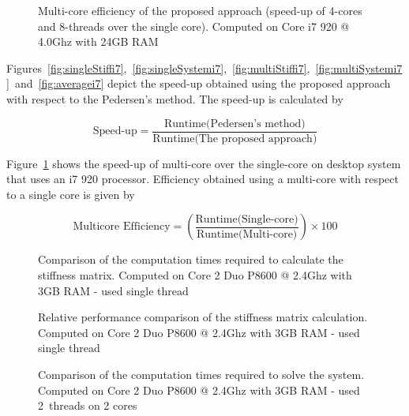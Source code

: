 \begin{figure}
\centerline{}
\caption{Multi-core efficiency of the proposed approach (speed-up of 4-cores and 8-threads over the single core). Computed on Core i7 920 @ 4.0Ghz with 24GB RAM}
\label{fig:mcEfficiencyi7}
\end{figure}

Figures~\ref{fig:singleStiffi7},~\ref{fig:singleSystemi7},~\ref{fig:multiStiffi7},~\ref{fig:multiSystemi7}~and~\ref{fig:averagei7} depict the speed-up obtained using the proposed approach with respect to the Pedersen's method. The speed-up is calculated by

\begin{equation}
\text{Speed-up} = \frac{\text{Runtime(Pedersen's method)}}{\text{Runtime(The proposed approach)}}
\label{eqn:5.2}
\end{equation}

Figure~\ref{fig:mcEfficiencyi7} shows the speed-up of multi-core over the single-core on desktop system that uses an i7 920 processor.
Efficiency obtained using a multi-core with respect to a single core is given by

\begin{equation}
\text{Multicore Efficiency} = \left(\frac{\text{Runtime(Single-core)}}{\text{Runtime(Multi-core)}}\right) \times 100
\label{eqn:5.3}
\end{equation}

\clearpage
\begin{figure}
\centerline{}
\caption{Comparison of the computation times required to calculate the stiffness matrix. Computed on Core 2 Duo P8600 @ 2.4Ghz with 3GB RAM - used single thread}
\label{fig:singleStiffc2CT}
\end{figure}

\begin{figure}
\centerline{}
\caption{Relative performance comparison of the stiffness matrix calculation. Computed on Core 2 Duo P8600 @ 2.4Ghz with 3GB RAM - used single thread}
\label{fig:singleStiffc2}
\end{figure}

\begin{figure}
\centerline{}
\caption{Comparison of the computation times required to solve the system. Computed on Core 2 Duo P8600 @ 2.4Ghz with 3GB RAM - used 2~threads on 2 cores}
\label{fig:sinlgeSystemc2CT}
\end{figure}

